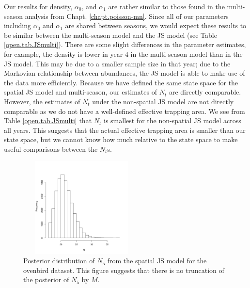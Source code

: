 Our results for density, $\alpha_0$, and $\alpha_1$ are rather similar
to those found in the multi-season analysis from
Chapt. \ref{chapt.poisson-mn}.  Since all of our parameters including
$\alpha_0$ and $\alpha_1$ are shared between seasons, we would expect
these results to be similar between the multi-season model and the JS
model (see Table \ref{open.tab.JSmulti}).  There are some slight
differences in the parameter estimates, for example, the density is
lower in year 4 in the multi-season model than in the JS model.  This
may be due to a smaller sample size in that year; due to the Markovian
relationship between abundances, the JS model is able to make use of
the data more efficiently.  Because we have defined the same state
space for the spatial JS model and multi-season, our estimates of
$N_t$ are directly comparable.  However, the estimates of $N_t$ under
the non-spatial JS model are not directly comparable as we do not have
a well-defined effective trapping area.  We see from Table
\ref{open.tab.JSmulti} that $N_t$ is smallest for the non-spatial JS
model across all years.  This suggests that the actual effective
trapping area is smaller than our state space, but we cannot know how
much relative to the state space to make useful comparisons between
the $N_t$s.

\begin{figure}
\centering
\includegraphics[height=2in,width=2.5in]{Ch16-Open/figs/Nhat5ovenbird.pdf}
\caption{Posterior distribution of $N_5$ from the spatial JS model for
  the ovenbird dataset.  This figure
suggests that there is no truncation of the posterior of $N_5$ by $M$. }
\label{open.figs.ovenbirdN5hist}
\end{figure}

